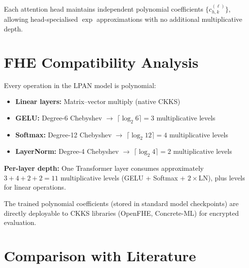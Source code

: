 \documentclass[12pt, a4paper]{article}
\begin{document}
\begin{contribution}
Each attention head maintains independent polynomial coefficients $\{c^{(\ell)}_{h,k}\}$, allowing head-specialised $\exp$ approximations with no additional multiplicative depth.
\end{contribution}

\section{FHE Compatibility Analysis}

Every operation in the LPAN model is polynomial:
\begin{itemize}[leftmargin=2em]
  \item \textbf{Linear layers:} Matrix--vector multiply (native CKKS)
  \item \textbf{GELU:} Degree-6 Chebyshev $\to$ $\lceil \log_2 6 \rceil = 3$ multiplicative levels
  \item \textbf{Softmax:} Degree-12 Chebyshev $\to$ $\lceil \log_2 12 \rceil = 4$ multiplicative levels
  \item \textbf{LayerNorm:} Degree-4 Chebyshev $\to$ $\lceil \log_2 4 \rceil = 2$ multiplicative levels
\end{itemize}

\textbf{Per-layer depth:} One Transformer layer consumes approximately $3 + 4 + 2 + 2 = 11$ multiplicative levels (GELU + Softmax + $2\times$LN), plus levels for linear operations.

The trained polynomial coefficients (stored in standard model checkpoints) are directly deployable to CKKS libraries (OpenFHE, Concrete-ML) for encrypted evaluation.

\section{Comparison with Literature}
\end{document}
